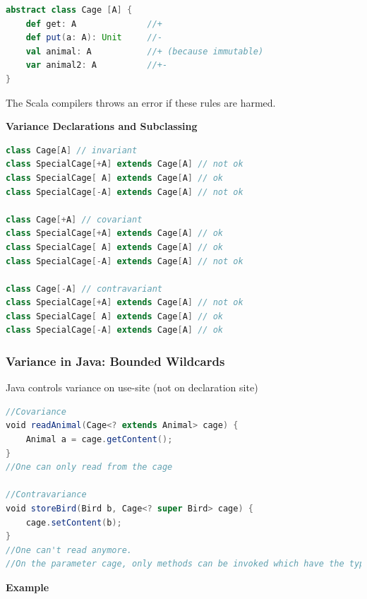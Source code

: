 \begin{lstlisting}[language=scala,mathescape=false]
abstract class Cage [A] {
    def get: A              //+
    def put(a: A): Unit     //-
    val animal: A           //+ (because immutable)
    var animal2: A          //+-
}
\end{lstlisting}

The Scala compilers throws an error if these rules are harmed.

\textbf{Variance Declarations and Subclassing}

\begin{lstlisting}[language=scala,mathescape=false]
class Cage[A] // invariant
class SpecialCage[+A] extends Cage[A] // not ok
class SpecialCage[ A] extends Cage[A] // ok
class SpecialCage[-A] extends Cage[A] // not ok

class Cage[+A] // covariant
class SpecialCage[+A] extends Cage[A] // ok
class SpecialCage[ A] extends Cage[A] // ok
class SpecialCage[-A] extends Cage[A] // not ok

class Cage[-A] // contravariant
class SpecialCage[+A] extends Cage[A] // not ok
class SpecialCage[ A] extends Cage[A] // ok
class SpecialCage[-A] extends Cage[A] // ok
\end{lstlisting}

\hypertarget{variance-in-java-bounded-wildcards}{%
\subsubsection{Variance in Java: Bounded
Wildcards}\label{variance-in-java-bounded-wildcards}}

Java controls variance on use-site (not on declaration site)

\begin{lstlisting}[language=scala,mathescape=false]
//Covariance
void readAnimal(Cage<? extends Animal> cage) {
    Animal a = cage.getContent();
}
//One can only read from the cage

//Contravariance
void storeBird(Bird b, Cage<? super Bird> cage) {
    cage.setContent(b);
}
//One can't read anymore. 
//On the parameter cage, only methods can be invoked which have the type parameter in a contravariant position
\end{lstlisting}

\clearpage
\textbf{Example}

